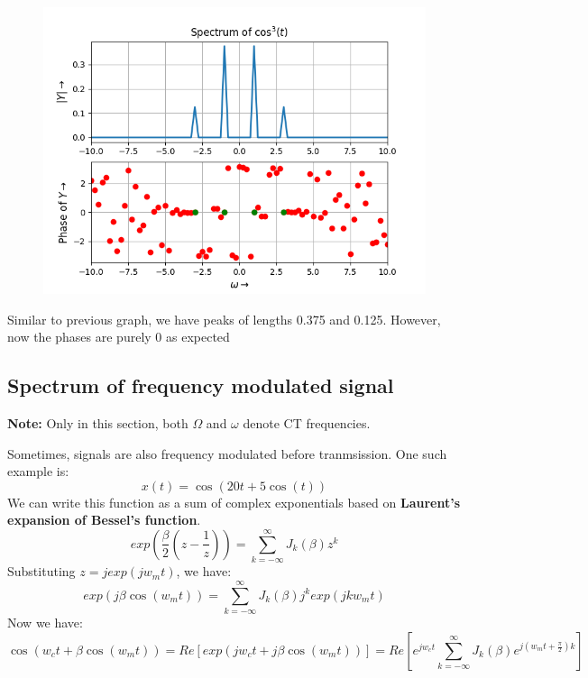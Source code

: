 \documentclass[12pt, a4paper]{article}
\begin{document}
\begin{figure}[H]
    \centering
    \includegraphics[scale = 0.8]{Figure_6.png}
    \label{fig:sample}
\end{figure}
\begin{center}
    Similar to previous graph, we have peaks of lengths 0.375 and 0.125. However, now the phases are purely 0 as expected
\end{center}
\subsection{Spectrum of frequency modulated signal}
\textbf{Note:} Only in this section, both $\Omega$ and $\omega$ denote CT frequencies.

Sometimes, signals are also frequency modulated before tranmsission. One such example is:
\begin{equation*}
    x(t) = \cos(20t+5\cos(t))
\end{equation*}
We can write this function as a sum of complex exponentials based on \textbf{Laurent's expansion of Bessel's function}.
\begin{equation*}
    exp(\frac{\beta}{2}(z-\frac{1}{z})) = \sum_{k=-\infty}^{\infty}J_{k}(\beta)z^{k}
\end{equation*}
Substituting $z = jexp(jw_{m}t)$, we have:
\begin{equation*}
    exp(j\beta\cos(w_{m}t)) = \sum_{k=-\infty}^{\infty}J_{k}(\beta)j^{k}exp(jkw_{m}t)
\end{equation*}
Now we have:
\begin{equation*}
    \cos(w_{c}t+\beta\cos(w_{m}t)) = Re[exp(jw_{c}t+j\beta\cos(w_{m}t))] = Re[e^{jw_{c}t}\sum_{k=-\infty}^{\infty}J_{k}(\beta)e^{j(w_{m}t+\frac{\pi}{2})k}]
\end{equation*}
\end{document}

